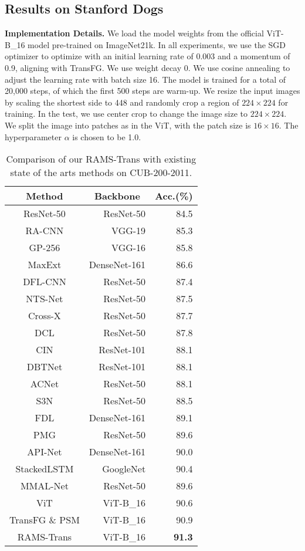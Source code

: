 \documentclass[sigconf]{acmart}
\begin{document}
\subsection{Results on Stanford Dogs}


\textbf{Implementation Details.} We load the model weights from the official ViT-B\_16 model pre-trained on ImageNet21k. In all experiments, we use the SGD optimizer to optimize with an initial learning rate of 0.003 and a momentum of 0.9, aligning with TransFG. We use weight decay 0. We use cosine annealing to adjust the learning rate with batch size 16. The model is trained for a total of 20,000 steps, of which the first 500 steps are warm-up. We resize the input images by scaling the shortest side to 448 and randomly crop a region of $224 \times 224$ for training. In the test, we use center crop to change the image size to $224 \times 224$. We split the image into patches as in the ViT, with the patch size is $16 \times 16$. The hyperparameter $\alpha$ is chosen to be 1.0.

\begin{table}[h]
\caption{Comparison of our RAMS-Trans with existing state of the arts methods on CUB-200-2011.}
\begin{center}
\begin{tabular}{c|rr}
\hline
Method
&\multicolumn{1}{c}{Backbone}
&\multicolumn{1}{c}{Acc.(\%)}
\\
\hline
ResNet-50 \cite{ResNet} & ResNet-50 & 84.5\\
RA-CNN \cite{RA-CNN}& VGG-19 & 85.3\\
GP-256 \cite{GP-256}& VGG-16 & 85.8 \\
MaxExt \cite{MaxEnt}& DenseNet-161 & 86.6\\
DFL-CNN \cite{DFL-CNN}& ResNet-50 & 87.4\\
NTS-Net \cite{NTS-Net}& ResNet-50 & 87.5\\
Cross-X \cite{Cross-X}& ResNet-50 & 87.7\\
DCL \cite{DCL}& ResNet-50 & 87.8\\
CIN \cite{CIN}& ResNet-101 &88.1\\
DBTNet \cite{DBTNet}& ResNet-101 &88.1\\
ACNet \cite{ACNet}& ResNet-50 &88.1 \\
S3N \cite{S3N}& ResNet-50 & 88.5\\
FDL \cite{FDL}& DenseNet-161 & 89.1\\
PMG \cite{PMG}& ResNet-50 & 89.6\\
API-Net \cite{API-Net}& DenseNet-161 & 90.0\\
StackedLSTM \cite{StackedLSTM}& GoogleNet & 90.4\\
MMAL-Net \cite{MMAL-Net}& ResNet-50 & 89.6\\
\hline
ViT  \cite{ViT}& ViT-B\_16 & 90.6\\
TransFG \& PSM \cite{TransFG}& ViT-B\_16 & 90.9\\
RAMS-Trans & ViT-B\_16 & \textbf{91.3}\\
\hline
\end{tabular}
\end{center}
\label{tab_base_model}
\end{table}
\end{document}
